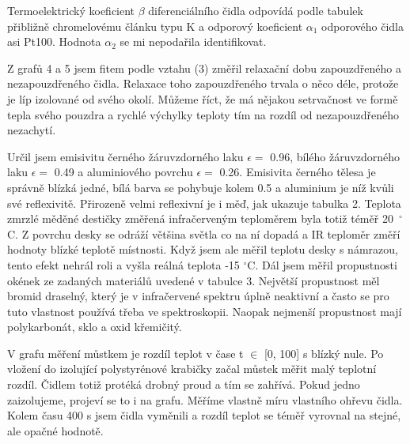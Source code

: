 \documentclass[a4paper,11pt]{article}
\begin{document}
\noindent
Termoelektrický koeficient $\beta$ diferenciálního čidla odpovídá podle tabulek přibližně chromelovému článku typu K a odporový koeficient $\alpha_1$ odporového čidla asi Pt100. Hodnota $\alpha_2$ se mi nepodařila identifikovat.

Z grafů 4 a 5 jsem fitem podle vztahu (3) změřil relaxační dobu zapouzdřeného a nezapouzdřeného čidla. Relaxace toho zapouzdřeného trvala o něco déle, protože je líp izolované od svého okolí. Můžeme říct, že má nějakou setrvačnost ve formě tepla svého pouzdra a rychlé výchylky teploty tím na rozdíl od nezapouzdřeného nezachytí.

Určil jsem emisivitu černého žáruvzdorného laku $\epsilon =$ 0.96, bílého žáruvzdorného laku $\epsilon =$ 0.49 a aluminiového povrchu $\epsilon =$ 0.26. Emisivita černého tělesa je správně blízká jedné, bílá barva se pohybuje kolem 0.5 a aluminium je níž kvůli své reflexivitě. Přirozeně velmi reflexivní je i měď, jak ukazuje tabulka 2. Teplota zmrzlé měděné destičky změřená infračerveným teploměrem byla totiž téměř 20~$^{\circ}$C. Z povrchu desky se odráží většina světla co na ní dopadá a IR teploměr změří hodnoty blízké teplotě místnosti. Když jsem ale měřil teplotu desky s námrazou, tento efekt nehrál roli a vyšla reálná teplota -15 $^{\circ}$C. Dál jsem měřil propustnosti okének ze zadaných materiálů uvedené v tabulce 3. Největší propustnost měl bromid draselný, který je v infračervené spektru úplně neaktivní a často se pro tuto vlastnost používá třeba ve spektroskopii. Naopak nejmenší propustnost mají polykarbonát, sklo a oxid křemičitý.

V grafu měření můstkem je rozdíl teplot v čase t $\in$  [0,  100] s blízký nule.
Po vložení do izolující polystyrénové krabičky začal můstek měřit malý teplotní rozdíl.
Čidlem totiž protéká drobný proud a tím se zahřívá. Pokud jedno zaizolujeme, projeví se to i na grafu. 
Měříme vlastně míru vlastního ohřevu čidla. Kolem času 400 s jsem čidla vyměnili a rozdíl teplot se téměř vyrovnal 
na stejné, ale opačné hodnotě.

\newpage
\end{document}
